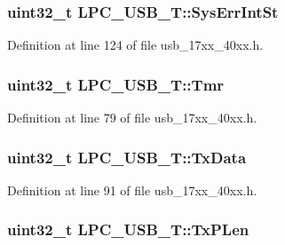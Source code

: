 \subsubsection[{\texorpdfstring{Sys\+Err\+Int\+St}{SysErrIntSt}}]{ uint32\+\_\+t L\+P\+C\+\_\+\+U\+S\+B\+\_\+\+T\+::\+Sys\+Err\+Int\+St}\hypertarget{structLPC__USB__T_a2eba7893b21e028b30e5058c0f06f142}{}\label{structLPC__USB__T_a2eba7893b21e028b30e5058c0f06f142}


Definition at line 124 of file usb\+\_\+17xx\+\_\+40xx.\+h.

\subsubsection[{\texorpdfstring{Tmr}{Tmr}}]{ uint32\+\_\+t L\+P\+C\+\_\+\+U\+S\+B\+\_\+\+T\+::\+Tmr}\hypertarget{structLPC__USB__T_a64bd05a84d557a38bade0c04e50dff61}{}\label{structLPC__USB__T_a64bd05a84d557a38bade0c04e50dff61}


Definition at line 79 of file usb\+\_\+17xx\+\_\+40xx.\+h.

\subsubsection[{\texorpdfstring{Tx\+Data}{TxData}}]{ uint32\+\_\+t L\+P\+C\+\_\+\+U\+S\+B\+\_\+\+T\+::\+Tx\+Data}\hypertarget{structLPC__USB__T_a65efd7667441a87d5c8d30905a3935a3}{}\label{structLPC__USB__T_a65efd7667441a87d5c8d30905a3935a3}


Definition at line 91 of file usb\+\_\+17xx\+\_\+40xx.\+h.

\subsubsection[{\texorpdfstring{Tx\+P\+Len}{TxPLen}}]{ uint32\+\_\+t L\+P\+C\+\_\+\+U\+S\+B\+\_\+\+T\+::\+Tx\+P\+Len}\hypertarget{structLPC__USB__T_a0fca415ac09c2f6423d4981e1258ae22}{}\label{structLPC__USB__T_a0fca415ac09c2f6423d4981e1258ae22}


